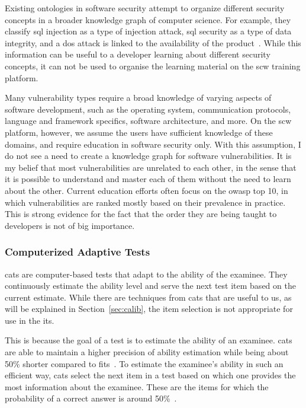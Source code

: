 Existing ontologies in software security attempt to organize different security concepts in a broader knowledge graph of computer science.
For example, they classify \gls{sql} injection as a type of injection attack, \gls{sql} security as a type of data integrity, and a \gls{dos} attack is linked to the availability of the product~\cite{kang2013security, jia2018practical}.
While this information can be useful to a developer learning about different security concepts, it can not be used to organise the learning material on the \gls{scw} training platform.

Many vulnerability types require a broad knowledge of varying aspects of software development, such as the operating system, communication protocols, language and framework specifics, software architecture, and more.
On the \gls{scw} platform, however, we assume the users have sufficient knowledge of these domains, and require education in software security only.
With this assumption, I do not see a need to create a knowledge graph for software vulnerabilities.
It is my belief that most vulnerabilities are unrelated to each other, in the sense that it is possible to understand and master each of them without the need to learn about the other.
Current education efforts often focus on the \gls{owasp} top 10, in which vulnerabilities are ranked mostly based on their prevalence in practice.
This is strong evidence for the fact that the order they are being taught to developers is not of big importance.

\subsubsection{Computerized Adaptive Tests}
\Glspl{cat} are computer-based tests that adapt to the ability of the examinee. 
They continuously estimate the ability level and serve the next test item based on the current estimate.
While there are techniques from \glspl{cat} that are useful to us, as will be explained in Section~\ref{sec:calib}, the item selection is not appropriate for use in the \gls{its}.

This is because the goal of a test is to estimate the ability of an examinee. \Glspl{cat} are able to maintain a higher precision of ability estimation while being about 50\% shorter compared to \glspl{fit}~\cite{weiss1984application}.
To estimate the examinee's ability in such an efficient way, \glspl{cat} select the next item in a test based on which one provides the most information about the examinee. 
These are the items for which the probability of a correct answer is around 50\%~\cite{magis2017computerized, ling2017computerized}.

